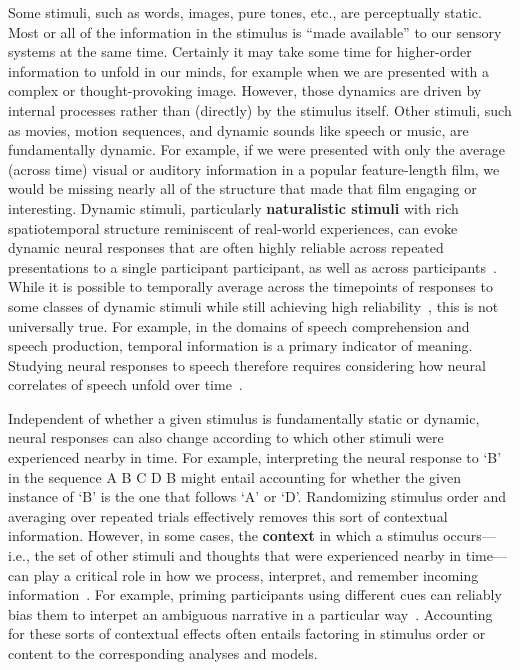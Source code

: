 \documentclass[runningheads]{llncs}
\begin{document}
Some stimuli, such as words, images, pure tones, etc., are
perceptually static.  Most or all of the information in the stimulus
is ``made available'' to our sensory systems at the same time.
Certainly it may take some time for higher-order information to unfold
in our minds, for example when we are presented with a complex or
thought-provoking image.  However, those dynamics are driven by
internal processes rather than (directly) by the stimulus itself.
Other stimuli, such as movies, motion sequences, and dynamic sounds
like speech or music, are fundamentally dynamic.  For example, if we
were presented with only the average (across time) visual or auditory
information in a popular feature-length film, we would be missing
nearly all of the structure that made that film engaging or
interesting.  Dynamic stimuli, particularly \textbf{naturalistic
  stimuli} with rich spatiotemporal structure reminiscent of
real-world experiences, can evoke dynamic neural responses that are
often highly reliable across repeated presentations to a single
participant participant, as well as across
participants~\citep{ChenEtal17, KhosEtal21, KiEtal16, NastEtal18,
  HassEtal10, Finn21, ChanEtal20, FinnBand21, MannEtal18, OwenEtal21,
  HuthEtal12, HuthEtal16}.  While it is possible to temporally average
across the timepoints of responses to some classes of dynamic stimuli
while still achieving high reliability~\citep{NastEtal18}, this is not
universally true.  For example, in the domains of speech comprehension
and speech production, temporal information is a primary indicator of
meaning.  Studying neural responses to speech therefore requires
considering how neural correlates of speech unfold over
time~\citep{HamiEtal21, ProiEtal22}.

Independent of whether a given stimulus is fundamentally static or
dynamic, neural responses can also change according to which other
stimuli were experienced nearby in time.  For example, interpreting
the neural response to `B' in the sequence A B C D B might entail
accounting for whether the given instance of `B' is the one that
follows `A' or `D'.  Randomizing stimulus order and averaging over
repeated trials effectively removes this sort of contextual
information.  However, in some cases, the \textbf{context} in which a
stimulus occurs---i.e., the set of other stimuli and thoughts that
were experienced nearby in time---can play a critical role in how we
process, interpret, and remember incoming information~\citep{Mann20}.
For example, priming participants using different cues can reliably
bias them to interpet an ambiguous narrative in a particular
way~\citep{YeshEtal17}.  Accounting for these sorts of contextual
effects often entails factoring in stimulus order or content to the
corresponding analyses and models.
\end{document}
